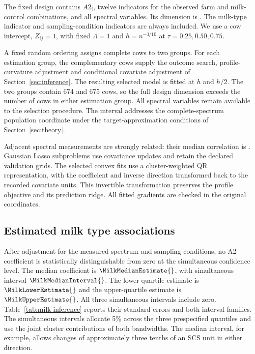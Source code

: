 The fixed design contains $A2_i$, twelve indicators for the observed
farm and milk-control combinations, and all \MilkSpectra{} spectral
variables. Its dimension is \MilkDimension{}. The milk-type indicator
and sampling-condition indicators are always included. We use a cow
intercept, $Z_{ij}=1$, with fixed $\Lambda=1$ and
$h=n^{-3/10}$ at $\tau=0.25,0.50,0.75$.

A fixed random ordering assigns complete cows to two groups. For each
estimation group, the complementary cows supply the outcome search,
profile-curvature adjustment and conditional covariate adjustment of
Section~\ref{sec:inference}. The resulting selected model is fitted
at $h$ and $h/2$. The two groups contain 674 and 675 cows, so the full
design dimension exceeds the number of cows in either estimation
group. All spectral variables remain available to the selection
procedure. The interval addresses the complete-spectrum population
coordinate under the target-approximation conditions of
Section~\ref{sec:theory}.

Adjacent spectral measurements are strongly related: their median
correlation is \MilkSpectralCorrelation{}. Gaussian Lasso subproblems
use covariance updates and retain the declared validation grids.
The selected convex fits use a cluster-weighted QR representation,
with the coefficient and inverse direction transformed back to the
recorded covariate units. This invertible transformation preserves
the profile objective and its prediction ridge. All fitted gradients
are checked in the original coordinates.

\subsection{Estimated milk type associations}



After adjustment for the measured spectrum and sampling conditions,
no A2 coefficient is statistically distinguishable from zero at the
simultaneous confidence level. The median
coefficient is $\MilkMedianEstimate{}$, with simultaneous
interval $\MilkMedianInterval{}$. The lower-quartile estimate is
$\MilkLowerEstimate{}$ and the upper-quartile estimate is
$\MilkUpperEstimate{}$. All three simultaneous intervals include zero.
Table~\ref{tab:milk-inference} reports their standard errors and both
interval families. The simultaneous intervals allocate 5\% across
the three prespecified quantiles and use the joint cluster
contributions of both bandwidths. The median interval, for example,
allows changes of approximately three tenths of an SCS unit in either
direction.

